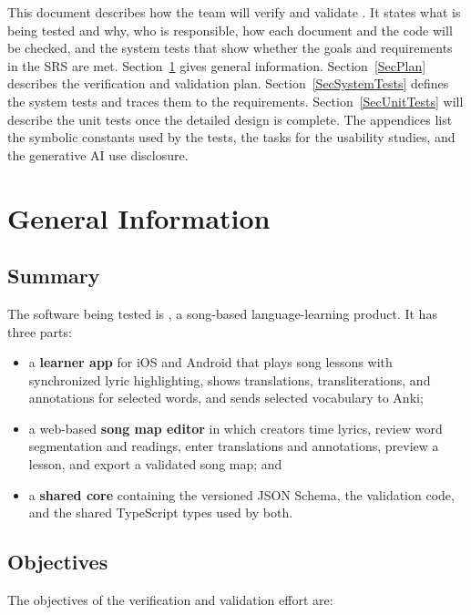 \documentclass[12pt, titlepage]{article}
\begin{document}
\newpage


This document describes how the team will verify and validate \progname{}. It
states what is being tested and why, who is responsible, how each document and
the code will be checked, and the system tests that show whether the goals and
requirements in the SRS are met. Section~\ref{SecGeneral} gives general
information. Section~\ref{SecPlan} describes the verification and validation
plan. Section~\ref{SecSystemTests} defines the system tests and traces them to
the requirements. Section~\ref{SecUnitTests} will describe the unit tests once
the detailed design is complete. The appendices list the symbolic constants
used by the tests, the tasks for the usability studies, and the generative AI
use disclosure.

\section{General Information} \label{SecGeneral}

\subsection{Summary}

The software being tested is \progname{}, a song-based language-learning
product. It has three parts:

\begin{itemize}
  \item a \textbf{learner app} for iOS and Android that plays song lessons with
        synchronized lyric highlighting, shows translations, transliterations,
        and annotations for selected words, and sends selected vocabulary to
        Anki;
  \item a web-based \textbf{song map editor} in which creators time lyrics,
        review word segmentation and readings, enter translations and
        annotations, preview a lesson, and export a validated song map; and
  \item a \textbf{shared core} containing the versioned JSON Schema, the
        validation code, and the shared TypeScript types used by both.
\end{itemize}

\subsection{Objectives}

The objectives of the verification and validation effort are:
\end{document}
